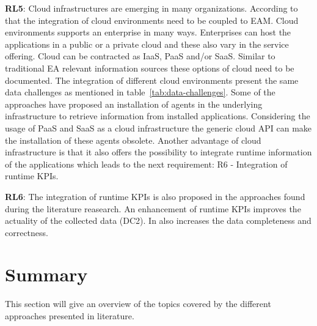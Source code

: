\textbf{RL5}: Cloud infrastructures are emerging in many organizations. \cite{Bogner2016}
According to that the integration of cloud environments need to be coupled to EAM. %
Cloud environments supports an enterprise in many ways. Enterprises can host the applications in a public or a private cloud and these also vary in the service offering. Cloud can be contracted as IaaS, PaaS and/or SaaS. Similar to traditional EA relevant information sources these options of cloud need to be documented. The integration of different cloud environments present the same data challenges as mentioned in table~\ref{tab:data-challenges}. Some of the approaches have proposed an installation of agents \cite{Landthaler2018}\cite{Farwick2010} in the underlying infrastructure to retrieve information from installed applications. Considering the usage of PaaS and SaaS as a cloud infrastructure the generic cloud API can make the installation of these agents obsolete.
Another advantage of cloud infrastructure is that it also offers the possibility to integrate runtime information of the applications which leads to the next requirement: R6 - Integration of runtime KPIs.

\textbf{RL6}: The integration of runtime KPIs is also proposed in the approaches found during the literature reasearch. \cite{Frank2009}\cite{Farwick2010}
An enhancement of runtime KPIs improves the actuality of the collected data (DC2). In also increases the data completeness and correctness. \cite{Frank2009}\cite{Farwick2010}\cite{Hauder2012}

\section{Summary}

This section will give an overview of the topics covered by the different approaches presented in literature. 


